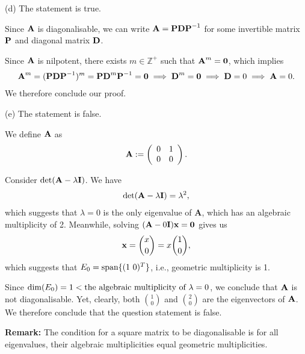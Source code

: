 \documentclass[12pt]{amsart}
\theoremstyle{plain}
\theoremstyle{definition}
\def\mb{\mathbb}
\def\bf{\textbf}
\newcommand{\tu}{\textup}
\newcommand{\RA}{\implies}
\newcommand{\spa}{\textup{span}}
\begin{document}
(d) The statement is true.

Since $\bf A$ is diagonalisable, we can write $\bf A=\bf P\bf D\bf P^{-1}$ for some invertible matrix $\bf P$ and diagonal matrix $\bf D$. 

Since $\bf A$ is nilpotent, there exists $m\in\mb Z^+$ such that $\bf A^m=\bf0$, which implies
\begin{align*}
	\bf A^m=(\bf P\bf D\bf P^{-1})^m=\bf P\bf D^m\bf P^{-1}=\bf0\RA \bf D^m=\bf 0\RA \bf D=0\RA \bf A=0.
\end{align*}
We therefore conclude our proof.

(e) The statement is false.

We define $\bf A$ as
\begin{align*}
	\bf A:=\left(
	\begin{array}{cc}
		0 & 1\\
		0 & 0\\
	\end{array}
	\right).
\end{align*}

Consider $\det(\bf A-\lambda\bf I)$. We have
\begin{align*}
	\det(\bf A-\lambda\bf I)=\lambda^2,
\end{align*}
which suggests that $\lambda=0$ is the only eigenvalue of \bf A, which has an algebraic multiplicity of 2. Meanwhile, solving $(\bf A-0\bf I)\bf x=\bf 0$ gives us
\begin{align*}
	\bf x=\binom{x}{0}=x\binom{1}{0},
\end{align*}
which suggests that $E_0=\spa\{(1\ 0)^T\}$, i.e., geometric multiplicity is 1.

Since $\dim(E_0)=1<\tu{the algebraic multiplicity of $\lambda=0$}$, we conclude that $\bf A$ is not diagonalisable. Yet, clearly, both $\binom10$ and $\binom 20$ are the eigenvectors of $\bf A$.  We therefore conclude that the question statement is false.


\noindent \bf{Remark:} The condition for a square matrix to be diagonalisable is for all eigenvalues, their algebraic multiplicities equal geometric multiplicities.





\end{document}
